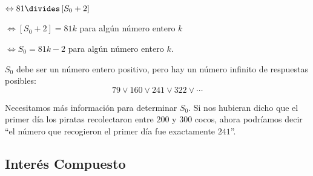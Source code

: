 $\Leftrightarrow 81\divides\left[S_0 + 2\right]$

$\Leftrightarrow\left[S_{0}+2\right]= 81k$ para algún número entero $k$

$\Leftrightarrow S_{0}=81k-2$ para algún número entero $k$.

$S_{0}$ debe ser un número entero positivo, pero hay un número infinito de respuestas posibles: \[ 79\vee160\vee241\vee322\vee\cdots \]

Necesitamos más información para determinar $S_0$. Si nos hubieran dicho que el primer día los piratas recolectaron entre $200$ y $300$ cocos, ahora podríamos decir ``el número que recogieron el primer día fue exactamente $241$''.

\subsection{Interés Compuesto}

